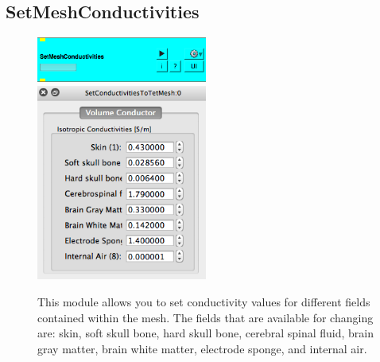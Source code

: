 \documentclass[fleqn,11pt,openany]{book}
\newcommand{\imgSm}{0.5}
\begin{document}
\subsection{SetMeshConductivities}
\begin{figure}[!h]
	\centering
	\includegraphics[width=\imgSm\textwidth]{BrainStimulation_figures/SetMeshConductivities.png}
	\includegraphics[width=\imgSm\textwidth]{BrainStimulation_figures/SetMeshConductivities_GUI.png}
	\caption{This module allows you to set conductivity values for different fields contained within the mesh. The fields that are available for changing are: skin, soft skull bone, hard skull bone, cerebral spinal fluid, brain gray matter, brain white matter, electrode sponge, and internal air.}
	\label{fig:set_conductivities_tet_mesh}
\end{figure}
\end{document}
